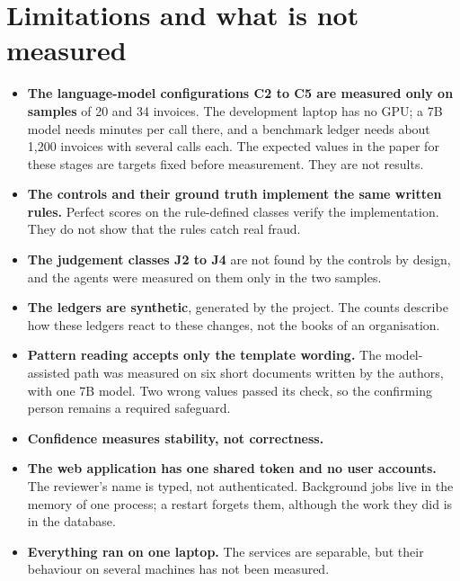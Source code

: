 \documentclass[11pt,a4paper]{article}
\begin{document}
\section{Limitations and what is not measured}
\begin{itemize}
\item \textbf{The language-model configurations C2 to C5 are measured only on samples} of 20 and 34 invoices. The development laptop has no GPU; a 7B model needs minutes per call there, and a benchmark ledger needs about 1,200 invoices with several calls each. The expected values in the paper for these stages are targets fixed before measurement. They are not results.
\item \textbf{The controls and their ground truth implement the same written rules.} Perfect scores on the rule-defined classes verify the implementation. They do not show that the rules catch real fraud.
\item \textbf{The judgement classes J2 to J4} are not found by the controls by design, and the agents were measured on them only in the two samples.
\item \textbf{The ledgers are synthetic}, generated by the project. The counts describe how these ledgers react to these changes, not the books of an organisation.
\item \textbf{Pattern reading accepts only the template wording.} The model-assisted path was measured on six short documents written by the authors, with one 7B model. Two wrong values passed its check, so the confirming person remains a required safeguard.
\item \textbf{Confidence measures stability, not correctness.}
\item \textbf{The web application has one shared token and no user accounts.} The reviewer's name is typed, not authenticated. Background jobs live in the memory of one process; a restart forgets them, although the work they did is in the database.
\item \textbf{Everything ran on one laptop.} The services are separable, but their behaviour on several machines has not been measured.
\end{itemize}

\end{document}
